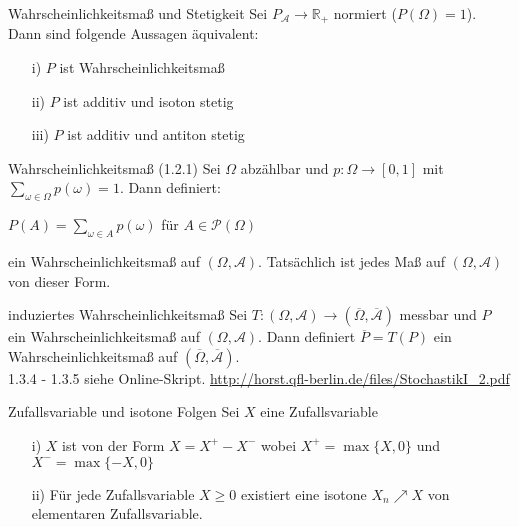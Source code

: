 \documentclass[avery5371,grid,frame]{flashcards} %
\newcommand{\1}{ \mathbb{1} } %
\begin{document}
\begin{flashcard}[Satz]{Wahrscheinlichkeitsmaß und Stetigkeit}
  Sei $P_\mathcal{A}\to \mathbb{R}_+$ normiert ($P(\Omega)=1$). Dann sind folgende Aussagen äquivalent:
  \begin{itemize}
  \item[i)] $P$ ist Wahrscheinlichkeitsmaß 
  \item[ii)] $P$ ist additiv und isoton stetig
  \item[iii)] $P$ ist additiv und antiton stetig
  \end{itemize}
\end{flashcard}

\begin{flashcard}[Satz]{Wahrscheinlichkeitsmaß (1.2.1)}
  Sei $\Omega$ abzählbar und $p: \Omega \to [0,1]$ mit
  $\sum\limits_{\omega \in \Omega}p(\omega)=1$. Dann definiert:
  \begin{center}
    $P(A)=\sum\limits_{\omega \in A} p(\omega)$ für $A\in
    \mathcal{P}(\Omega)$
  \end{center}
  ein Wahrscheinlichkeitsmaß auf $(\Omega,\mathcal{A})$. Tatsächlich ist jedes Maß auf
  $(\Omega,\mathcal{A})$ von dieser Form.
\end{flashcard}

\begin{flashcard}[Satz]{induziertes Wahrscheinlichkeitsmaß}
  Sei $T:(\Omega, \mathcal{A})\to(\overline{\Omega},\overline{\mathcal{A}})$ messbar und $P$ ein Wahrscheinlichkeitsmaß auf $(\Omega, \mathcal{A})$. Dann definiert $\overline{P}=T(P)$ ein Wahrscheinlichkeitsmaß auf $(\overline{\Omega},\overline{\mathcal{A}})$.\\
  1.3.4 - 1.3.5 siehe Online-Skript. \url{http://horst.qfl-berlin.de/files/StochastikI_2.pdf}
\end{flashcard}

\begin{flashcard}[Satz]{Zufallsvariable und isotone Folgen }
  Sei $X$ eine Zufallsvariable 
  \begin{itemize}
  \item[i)] $X$ ist von der Form $X=X^+-X^-$ wobei $X^+=\max\{X,0\}$ und $X^-=\max\{-X,0\}$
  \item[ii)] Für jede Zufallsvariable $X\geq0$ existiert eine isotone $X_n \nearrow X$ von elementaren Zufallsvariable.
  \end{itemize}
\end{flashcard}
\end{document}
